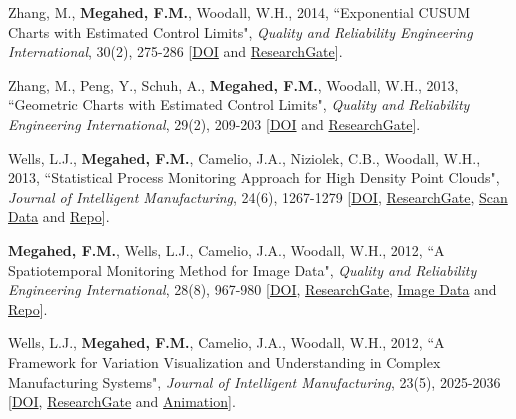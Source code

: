 \documentclass[margin,line]{res}
\begin{document}
\begin{resume}
\vspace{-1.5mm}
Zhang, M., \textbf{Megahed, F.M.}, Woodall, W.H., 2014, ``Exponential CUSUM Charts with Estimated Control Limits", \textit{Quality and Reliability Engineering International}, 30(2), 275-286 [\faFile*\href{ https://doi.org/10.1002/qre.1495}{DOI} and \faResearchgate \href{https://www.researchgate.net/publication/260531131_Exponential_CUSUM_Charts_with_Estimated_Control_Limits}{ResearchGate}].

\vspace{-1.5mm}
Zhang, M., Peng, Y., Schuh, A., \textbf{Megahed, F.M.}, Woodall, W.H., 2013, ``Geometric Charts with Estimated Control Limits", \textit{Quality and Reliability Engineering International}, 29(2), 209-203 [\faFile*\href{https://doi.org/10.1002/qre.1304}{DOI} and \faResearchgate \href{https://www.researchgate.net/publication/263150201_Geometric_Charts_with_Estimated_Control_Limits}{ResearchGate}].

\vspace{-1.5mm}
Wells, L.J., \textbf{Megahed, F.M.}, Camelio, J.A., Niziolek, C.B., Woodall, W.H., 2013, ``Statistical Process Monitoring Approach for High Density Point Clouds", \textit{Journal of Intelligent Manufacturing}, 24(6), 1267-1279 [\faFile*\href{https://doi.org/10.1007/s10845-012-0665-2}{DOI}, \faResearchgate \href{https://www.researchgate.net/publication/257581273_Statistical_process_monitoring_approach_for_high-density_point_clouds}{ResearchGate}, \faDatabase \href{https://www.dropbox.com/sh/i86wvm6vwlyr6cl/AAAZdM0i0y-L959ez6nkO2r8a?dl=0}{Scan Data} and \faGithub \href{https://github.com/fmegahed/3Dscans}{Repo}].

\vspace{-1.5mm}
\textbf{Megahed, F.M.}, Wells, L.J., Camelio, J.A., Woodall, W.H., 2012, ``A Spatiotemporal Monitoring Method for Image Data", \textit{Quality and Reliability Engineering International}, 28(8), 967-980 [\faFile*\href{https://doi.org/10.1007/s10845-012-0665-2}{DOI}, \faResearchgate \href{https://www.researchgate.net/publication/257581273_Statistical_process_monitoring_approach_for_high-density_point_clouds}{ResearchGate}, \faDatabase \href{https://www.dropbox.com/sh/ke4o1blz2gdazxp/AAAfdEVue8txY7NSe65IYx4Ka?dl=0}{Image Data} and \faGithub \href{https://github.com/fmegahed/imageST/}{Repo}].

\vspace{-1.5mm}
Wells, L.J., \textbf{Megahed, F.M.}, Camelio, J.A., Woodall, W.H., 2012, ``A Framework for Variation Visualization and Understanding in Complex Manufacturing Systems", \textit{Journal of Intelligent Manufacturing}, 23(5), 2025-2036 [\faFile*\href{https://doi.org/10.1007/s10845-011-0529-1}{DOI}, \faResearchgate \href{https://www.researchgate.net/publication/251224587_A_framework_for_variation_visualization_and_understanding_in_complex_manufacturing_systems}{ResearchGate} and \faVideo \href{https://youtu.be/Tq8d9aj8UbI}{Animation}].


\end{resume}
\end{document}
